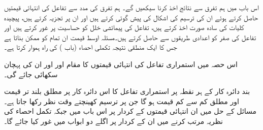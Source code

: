 اس باب میں ہم تفرق سے نتائج اخذ کرنا سیکھیں گے۔ ہم تفرق کی مدد سے تفاعل کی انتہائی قیمتیں حاصل کرتے ہوئے ان کی ترسیم کی اشکال کی پیش گوئی کرتے ہیں اور ان پر تجزیہ کرتے ہیں، پیچیدہ کلیات کی سادہ صورت اخذ کرتے ہیں، تفاعل کی پیمائشی خلل کو حساسیت پر غور کرتے ہیں اور تفاعل کی صفر کو اعدادی طریقوں سے حاصل کرتے ہیں۔مسئلہ اوسط قیمت ان تمام کو ممکن بناتا ہے جس کا ایک منطقی نتیجہ  تکملی احصاء (باب  ) کی راہ ہموار کرتا ہے۔  

اس حصہ میں استمراری تفاعل کی انتہائی قیمتوں کا مقام اور اور ان کی پہچان سکھائی جائے گی۔

بند دائرہ کار کے ہر نقطہ پر استمراری تفاعل کا اس دائرہ کار پر مطلق بلند تر قیمت اور مطلق کم سے کم قیمت ہو گا جن پر ترسیم کھینچتے وقت  نظر رکھا جاتا ہے۔ مسائل کے حل میں ان انتہائی قیمتوں  کے کردار پر اس باب میں  جبکہ تکمل احصاء کی  نظریہ مرتب کرنے میں ان کے کردار پر اگلے دو ابواب میں غور کیا جائے گا۔  

